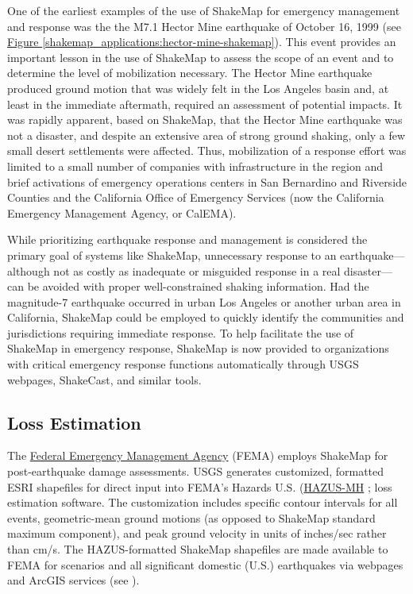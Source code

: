 \documentclass[letterpaper,10pt,english]{sphinxmanual}
\begin{document}
One of the earliest examples of the use of ShakeMap for emergency management and response was the
the M7.1 Hector Mine earthquake of October 16, 1999 (see \hyperref[shakemap_applications:hector-mine-shakemap]{Figure  \ref*{shakemap_applications:hector-mine-shakemap}}).
This event provides an important lesson in the use of
ShakeMap to assess the scope of an event and to determine the level of mobilization necessary.
The Hector Mine earthquake produced ground motion that was widely felt in
the Los Angeles basin and, at least in the immediate aftermath, required an assessment of potential impacts.
It was rapidly apparent, based on ShakeMap, that the Hector Mine earthquake was not a disaster, and despite an
extensive area of strong ground shaking, only a few small desert settlements were affected. Thus,
mobilization of a response effort was limited to a small number of companies
with infrastructure in the region and brief activations of emergency operations centers in
San Bernardino and Riverside Counties and the California Office of Emergency Services
(now the California Emergency Management Agency, or CalEMA).

While prioritizing earthquake response and management is considered
the primary goal of systems like ShakeMap, unnecessary response to an
earthquake---although not as costly as inadequate or misguided response in a real
disaster---can be avoided with proper well-constrained shaking information. Had the magnitude-7 earthquake occurred in
urban Los Angeles or another urban area in California, ShakeMap could be
employed to quickly identify the communities and jurisdictions requiring
immediate response.  To help facilitate the use of ShakeMap in emergency
response, ShakeMap is now provided to organizations with critical emergency
response functions automatically through USGS webpages, ShakeCast, and similar
tools.


\subsection{Loss Estimation}
\label{shakemap_applications:loss-estimation}
The \href{http://www.fema.gov/}{Federal Emergency Management Agency} (FEMA) employs ShakeMap for
post-earthquake damage assessments.
USGS generates customized, formatted ESRI shapefiles for direct input into
FEMA’s Hazards U.S. (\href{http://www.fema.gov/hazus}{HAZUS-MH} ; {\hyperref[references:fema2006]{}} loss estimation software. The customization includes specific contour intervals for
all events, geometric-mean ground motions (as opposed to ShakeMap standard
maximum component), and peak ground velocity in units of inches/sec rather than
cm/s. The HAZUS-formatted ShakeMap shapefiles are made available to FEMA for scenarios and
all significant domestic (U.S.) earthquakes
via webpages and ArcGIS services (see {\hyperref[products:gis\string-services]{}}).
\end{document}
